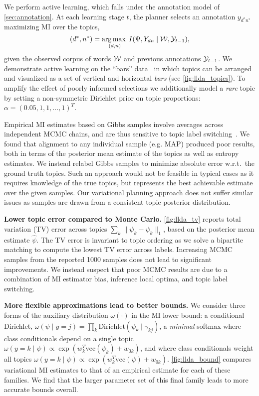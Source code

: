 We perform active learning, which falls under the annotation model of
\SEC\ref{sec:annotation}.  At each learning stage $t$, the planner
selects an annotation $y_{d^*n^*}$ maximizing MI over the topics,
\begin{equation}
  (d^*,n^*) = \operatorname*{arg\,max\;}_{(d,n)} I(\Psi, Y_{dn} \mid \mathcal{W}, \mathcal{Y}_{t-1}),
\end{equation}
given the observed corpus of words $\mathcal{W}$ and previous annotations
$\mathcal{Y}_{t-1}$.  We demonstrate active learning on the ``bars''
data~\citep{griffiths2004finding} in which topics can be arranged and
visualized as a set of vertical and horizontal \emph{bars} (see
\FIG\ref{fig:llda_topics}).  To amplify the effect of poorly informed
selections we additionally model a \emph{rare} topic by setting a
non-symmetric Dirichlet prior on topic proportions: $\alpha = (0.05,
1, 1, \ldots, 1)^T$.

Empirical MI estimates based on Gibbs samples involve averages across
independent MCMC chains, and are thus sensitive to topic label
switching~\citep{stephens2000dealing}.  We found that alignment to any
individual sample (e.g. MAP) produced poor results, both in terms of
the posterior mean estimate of the topics as well as entropy
estimates.  We instead relabel Gibbs samples to minimize absolute
error w.r.t.~the ground truth topics.  Such an approach would not be
feasible in typical cases as it requires knowledge of the true topics,
but represents the best achievable estimate over the given samples.  Our
variational planning approach does not suffer similar issues as
samples are drawn from a consistent topic posterior distribution.

\textbf{Lower topic error compared to Monte Carlo.}
\FIG\ref{fig:llda_tv} reports total variation (TV) error across topics
$\sum_k \|\psi_k - \hat{\psi}_k\|_1$, based on the posterior mean
estimate $\hat{\psi}$.  The TV error is invariant to topic ordering
as we solve a bipartite matching to compute the lowest TV error across
labels.  Increasing MCMC samples from the reported 1000 samples does
not lead to significant improvements.  We instead suspect that poor
MCMC results are due to a combination of MI estimator bias, inference
local optima, and topic label switching.

\textbf{More flexible approximations lead to better bounds.}  We
consider three forms of the auxiliary distribution $\omega(\cdot)$ in
the MI lower bound: a conditional Dirichlet, $\omega(\psi \mid y=j) =
\prod_k \text{Dirichlet}(\psi_k \mid \gamma_{kj})$, a \emph{minimal}
softmax where class conditionals depend on a single topic $\omega(y =
k \mid \psi) \propto \exp( w_k^T \text{vec}(\psi_k) + w_{0k} )$, and
where class conditionals weight all topics \mbox{$\omega(y = k \mid
  \psi) \propto \exp( w_k^T \text{vec}(\psi) + w_{0k}
  )$}. \FIG\ref{fig:llda_bound} compares variational MI estimates to
that of an empirical estimate for each of these families.  We find
that the larger parameter set of this final family leads to more
accurate bounds overall.


